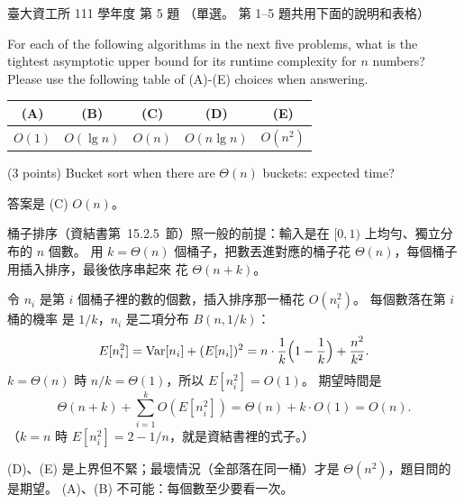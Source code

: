 \begin{pastexam}[label={px:ntu-111-dsaa-05}]{臺大資工所 111 學年度 第 5 題}
（單選。 第 1--5 題共用下面的說明和表格）

For each of the following algorithms in the next five problems, what is the tightest asymptotic
upper bound for its runtime complexity for $n$ numbers? Please use the following table of (A)-(E)
choices when answering.
\begin{center}
\begin{tabular}{c|c|c|c|c}
(A) & (B) & (C) & (D) & (E) \\ \hline
$O(1)$ & $O(\lg n)$ & $O(n)$ & $O(n\lg n)$ & $O(n^2)$
\end{tabular}
\end{center}

(3 points) Bucket sort when there are $\Theta(n)$ buckets: expected time?
\end{pastexam}

\begin{pastsoln}
答案是 (C) $O(n)$。

桶子排序（資結書第~15.2.5~節）照一般的前提：輸入是在 $[0, 1)$ 上均勻、獨立分布的 $n$ 個數。
用 $k = \Theta(n)$ 個桶子，把數丟進對應的桶子花 $\Theta(n)$，每個桶子用插入排序，最後依序串起來
花 $\Theta(n + k)$。

令 $n_i$ 是第 $i$ 個桶子裡的數的個數，插入排序那一桶花 $O(n_i^2)$。 每個數落在第 $i$ 桶的機率
是 $1/k$，$n_i$ 是二項分布 $B(n, 1/k)$：
\[
E[n_i^2] = \mathrm{Var}[n_i] + (E[n_i])^2 = n \cdot \frac{1}{k}\Bigl(1 - \frac{1}{k}\Bigr) + \frac{n^2}{k^2}.
\]
$k = \Theta(n)$ 時 $n/k = \Theta(1)$，所以 $E[n_i^2] = O(1)$。 期望時間是
\[
\Theta(n + k) + \sum_{i=1}^{k} O(E[n_i^2]) = \Theta(n) + k \cdot O(1) = O(n).
\]
（$k = n$ 時 $E[n_i^2] = 2 - 1/n$，就是資結書裡的式子。）

(D)、(E) 是上界但不緊；最壞情況（全部落在同一桶）才是 $\Theta(n^2)$，題目問的是期望。 (A)、(B)
不可能：每個數至少要看一次。
\end{pastsoln}
